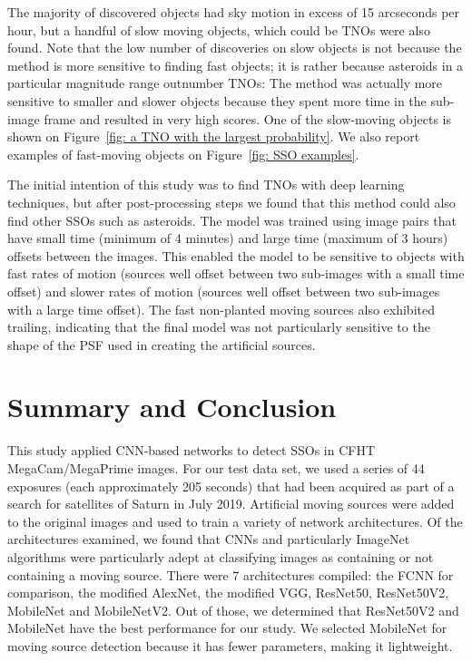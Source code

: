 \documentclass{aastex631}
\begin{document}
The majority of discovered objects had sky motion in excess of 15 arcseconds per hour, but a handful of slow moving objects, which could be TNOs were also found.
Note that the low number of discoveries on slow objects is not because the method is more sensitive to finding fast objects; it is rather because asteroids in a particular magnitude range outnumber TNOs: The method was actually more sensitive to smaller and slower objects because they spent more time in the sub-image frame and resulted in very high scores.
One of the slow-moving objects is shown on Figure~\ref{fig: a TNO with the largest probability}.
We also report examples of fast-moving objects on Figure~\ref{fig: SSO examples}.

The initial intention of this study was to find TNOs with deep learning techniques, but after post-processing steps we found that this method could also find other SSOs such as asteroids.
The model was trained using image pairs that have small time (minimum of 4 minutes) and large time (maximum of 3 hours) offsets between the images.
This enabled the model to be sensitive to objects with fast rates of motion (sources well offset between two sub-images with a small time offset) and slower rates of motion (sources well offset between two sub-images with a large time offset).
The fast non-planted moving sources also exhibited trailing, indicating that the final model was not particularly sensitive to the shape of the PSF used in creating the artificial sources.

\section{Summary and Conclusion}
This study applied CNN-based networks to detect SSOs in CFHT MegaCam/MegaPrime images.
For our test data set, we used a series of 44 exposures (each approximately 205 seconds) that had been acquired as part of a search for satellites of Saturn in July 2019.
Artificial moving sources were added to the original images and used to train a variety of network architectures.
Of the architectures examined, we found that CNNs and particularly ImageNet algorithms were particularly adept at classifying images as containing or not containing a moving source.
There were 7 architectures compiled: the FCNN for comparison, the modified AlexNet, the modified VGG, ResNet50, ResNet50V2, MobileNet and MobileNetV2.
Out of those, we determined that ResNet50V2 and MobileNet have the best performance for our study.
We selected MobileNet for moving source detection because it has fewer parameters, making it lightweight.
\end{document}
